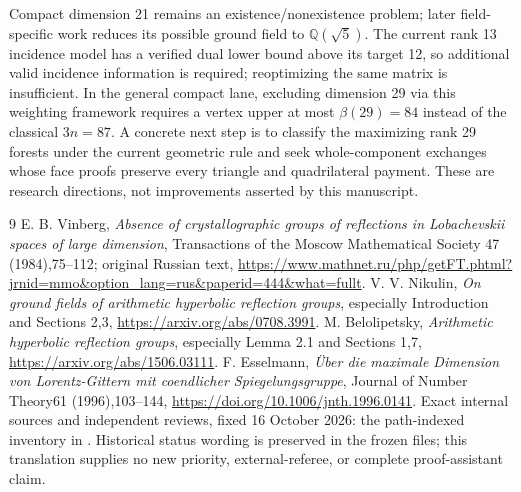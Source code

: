 \documentclass[11pt]{article}
\newcommand{\Q}{\mathbb Q}
\begin{document}
Compact dimension 21 remains an existence/nonexistence problem; later
field-specific work reduces its possible ground field to $\Q(\sqrt 5)$.
The current rank 13 incidence model has a verified dual lower bound above
its target 12, so additional valid incidence information is required;
reoptimizing the same matrix is insufficient. In the general compact
lane, excluding dimension 29 via this weighting framework requires a
vertex upper at most $\beta(29)=84$ instead of the classical $3n=87$.
A concrete next step is to classify the maximizing rank 29 forests under
the current geometric rule and seek whole-component exchanges whose
face proofs preserve every triangle and quadrilateral payment. These
are research directions, not improvements asserted by this manuscript.

\begin{thebibliography}{9}
 E. B. Vinberg, \emph{Absence of crystallographic groups of
reflections in Lobachevskii spaces of large dimension}, Transactions of the
Moscow Mathematical Society 47 (1984),75--112; original Russian text,
\url{https://www.mathnet.ru/php/getFT.phtml?jrnid=mmo&option_lang=rus&paperid=444&what=fullt}.
 V. V. Nikulin, \emph{On ground fields of arithmetic
hyperbolic reflection groups}, especially Introduction and Sections 2,3,
\url{https://arxiv.org/abs/0708.3991}.
 M. Belolipetsky, \emph{Arithmetic hyperbolic reflection
groups}, especially Lemma 2.1 and Sections 1,7,
\url{https://arxiv.org/abs/1506.03111}.
 F. Esselmann, \emph{\"Uber die maximale Dimension von
Lorentz-Gittern mit coendlicher Spiegelungsgruppe}, Journal of Number
Theory61 (1996),103--144, \url{https://doi.org/10.1006/jnth.1996.0141}.
 Exact internal sources and independent reviews, fixed
16 October 2026: the path-indexed inventory in
. Historical status wording is
preserved in the frozen files; this translation supplies no new priority,
external-referee, or complete proof-assistant claim.
\end{thebibliography}
\end{document}
